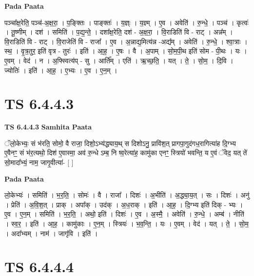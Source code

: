 \documentclass[17pt]{extarticle}
\begin{document}
\textbf{Pada Paata} \newline

पञ्चा᳚क्ष॒रेति॒ पञ्च॑-अ॒क्ष॒रा॒ । प॒ङ्क्तिः । पाङ्क्तः॑ । य॒ज्ञ्ः । य॒ज्ञ्म् । ए॒व । अवेति॑ । रु॒न्धे॒ । पञ्च॑ । कृत्वः॑ । तू॒ष्णीम् । दश॑ । समिति॑ । प॒द्य॒न्ते॒ । दशा᳚क्ष॒रेति॒ दश॑ - अ॒क्ष॒रा॒ । वि॒राडिति॑ वि - राट् । अन्न᳚म् । वि॒राडिति॑ वि - राट् । वि॒राजेति॑ वि - राजा᳚ । ए॒व । अ॒न्नाद्य॒मित्य॑न्न -अद्य᳚म् । अवेति॑ । रु॒न्धे॒ । श्वा॒त्राः । स्थ॒ । वृ॒त्र॒तुर॒ इति॑ वृत्र - तुरः॑ । इति॑ । आ॒ह॒ । ए॒षः । वै । अ॒पाम् । सो॒म॒पी॒थ इति॑ सोम - पी॒थः । यः । ए॒वम् । वेद॑ । न । अ॒फ्स्वित्य॑प् - सु । आर्ति᳚म् । एति॑ । ऋ॒च्छ॒ति॒ । यत् । ते॒ । सो॒म॒ । दि॒वि । ज्योतिः॑ । इति॑ । आ॒ह॒ । ए॒भ्यः । ए॒व । ए॒न॒म् ।  \newline





\section{ TS 6.4.4.3 }

\textbf{TS 6.4.4.3 } \newline
\textbf{Samhita Paata} \newline

ॅलो॒केभ्यः॒ सं भ॑रति॒ सोमो॒ वै राजा॒ दिशो॒ऽभ्य॑द्ध्याय॒थ् स दिशोऽनु॒ प्रावि॑श॒त् प्रागपा॒गुद॑गध॒रागित्या॑ह दि॒ग्भ्य ए॒वैनꣳ॒॒ सं भ॑र॒त्यथो॒ दिश॑ ए॒वास्मा॒ अव॑ रु॒न्धे ऽम्ब॒ नि ष्व॒रेत्या॑ह॒ कामु॑का एनꣳ॒॒ स्त्रियो॑ भवन्ति॒ य ए॒वं ॅवेद॒ यत् ते॑ सो॒मादा᳚भ्यं॒ नाम॒ जागृ॒वीत्या॑- [  ] \newline

\textbf{Pada Paata} \newline

लो॒केभ्यः॑ । समिति॑ । भ॒र॒ति॒ । सोमः॑ । वै । राजा᳚ । दिशः॑ । अ॒भीति॑ । अ॒द्ध्या॒य॒त् । सः । दिशः॑ । अनु॑ । प्रेति॑ । अ॒वि॒श॒त् । प्राक् । अपा᳚क् । उद॑क् । अ॒ध॒राक् । इति॑ । आ॒ह॒ । दि॒ग्भ्य इति॑ दिक् - भ्यः । ए॒व । ए॒न॒म् । समिति॑ । भ॒र॒ति॒ । अथो॒ इति॑ । दिशः॑ । ए॒व । अ॒स्मै॒ । अवेति॑ । रु॒न्धे॒ । अम्ब॑ । नीति॑ । स्व॒र॒ । इति॑ । आ॒ह॒ । कामु॑काः । ए॒न॒म् । स्त्रियः॑ । भ॒व॒न्ति॒ । यः । ए॒वम् । वेद॑ । यत् । ते॒ । सो॒म॒ । अदा᳚भ्यम् । नाम॑ । जागृ॑वि । इति॑ ।  \newline





\section{ TS 6.4.4.4 }
\end{document}
